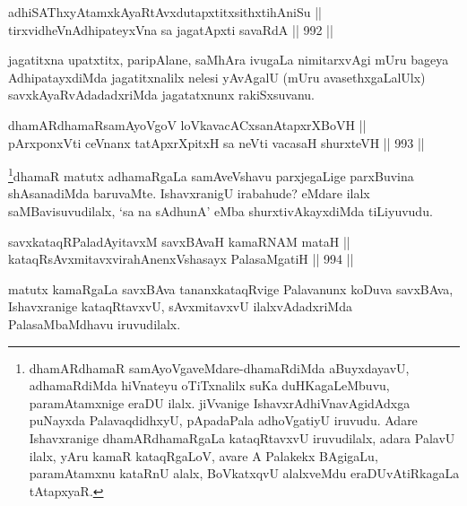 \begin{shl}
adhiSAThxyA\s \s tamxkAyaRtAvxdutapxtitxsithxtihAniSu || \\
tirxvidheVnA\s \s dhipateyxVna sa jagatApxti savaRdA \hfill || 992 ||  
\end{shl}

\begin{artha}
jagatitxna upatxtitx, paripAlane, saMhAra ivugaLa nimitarxvAgi mUru bageya AdhipatayxdiMda jagatitxnalilx nelesi yAvAgalU (mUru avasethxgaLalUlx) savxkAyaRvAdadadxriMda jagatatxnunx rakiSxsuvanu.
\end{artha}


\begin{shl}
dhamARdhamaRsamAyoVgoV loVkavacACxsanAtapxrXBoVH || \\
pArxponxVti ceVnanx tatApxrXpitxH sa neVti vacasaH shurxteVH \hfill || 993 ||  
\end{shl}

\begin{artha}
\footnote{dhamARdhamaR samAyoVgaveMdare-dhamaRdiMda aBuyxdayavU, adhamaRdiMda hiVnateyu oTiTxnalilx suKa duHKagaLeMbuvu, paramAtamxnige eraDU ilalx. jiVvanige IshavxrAdhiVnavAgidAdxga puNayxda PalavaqdidhxyU, pApadaPala adhoVgatiyU iruvudu. Adare Ishavxranige dhamARdhamaRgaLa kataqRtavxvU iruvudilalx, adara PalavU ilalx, yAru kamaR kataqRgaLoV, avare A Palakekx BAgigaLu, paramAtamxnu kataRnU alalx, BoVkatxqvU alalxveMdu eraDUvAtiRkagaLa tAtapxyaR.}dhamaR matutx adhamaRgaLa samAveVshavu parxjegaLige parxBuvina shAsanadiMda baruvaMte. IshavxranigU irabahude? eMdare ilalx saMBavisuvudilalx, `sa na sAdhunA' eMba shurxtivAkayxdiMda tiLiyuvudu.
\end{artha}

\begin{shl}
\footnotemark[2]savxkataqRPaladAyitavxM savxBAvaH kamaRNAM mataH || \\
kataqRsAvxmitavxvirahAnenxVshasayx PalasaMgatiH \hfill || 994 ||  
\end{shl}

\begin{artha}
matutx kamaRgaLa savxBAva tananxkataqRvige Palavanunx koDuva savxBAva, Ishavxranige kataqRtavxvU, sAvxmitavxvU ilalxvAdadxriMda PalasaMbaMdhavu iruvudilalx.
\end{artha}


